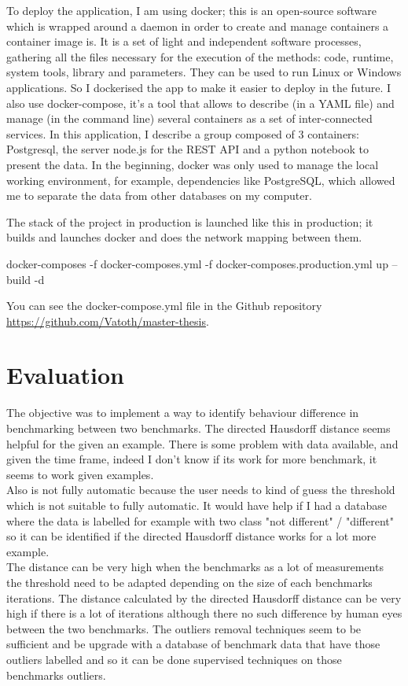 \documentclass[12pt,a4paper]{article}
\begin{document}
To deploy the application, I am using docker; this is an open-source software which is wrapped around a daemon in order to create and manage containers a container image is. It is a set of light and independent software processes, gathering all the files necessary for the execution of the methods: code, runtime, system tools, library and parameters. They can be used to run Linux or Windows applications. So I dockerised the app to make it easier to deploy in the future. I also use docker-compose, it's a tool that allows to describe (in a YAML file) and manage (in the command line) several containers as a set of inter-connected services. In this application, I describe a group composed of 3 containers: Postgresql, the server node.js for the REST API and a python notebook to present the data. In the beginning, docker was only used to manage the local working environment, for example, dependencies like PostgreSQL, which allowed me to separate the data from other databases on my computer.

The stack of the project in production is launched like this in production; it builds and launches docker and does the network mapping between them.

docker-composes -f docker-composes.yml -f docker-composes.production.yml up --build -d

You can see the docker-compose.yml file in the Github repository \url{https://github.com/Vatoth/master-thesis}. 

\section{Evaluation}

The objective was to implement a way to identify behaviour difference in benchmarking between two benchmarks. The directed Hausdorff distance seems helpful for the given an example. There is some problem with data available, and given the time frame, indeed I don't know if its work for more benchmark, it seems to work given examples. \\
Also is not fully automatic because the user needs to kind of guess the threshold which is not suitable to fully automatic. It would have help if I had a database where the data is labelled for example with two class "not different" / "different" so it can be identified if the directed Hausdorff distance works for a lot more example. \\
The distance can be very high when the benchmarks as a lot of measurements the threshold need to be adapted depending on the size of each benchmarks iterations. The distance calculated by the directed Hausdorff distance can be very high if there is a lot of iterations although there no such difference by human eyes between the two benchmarks.
The outliers removal techniques seem to be sufficient and be upgrade with a database of benchmark data that have those outliers labelled and so it can be done supervised techniques on those benchmarks outliers.
\end{document}
